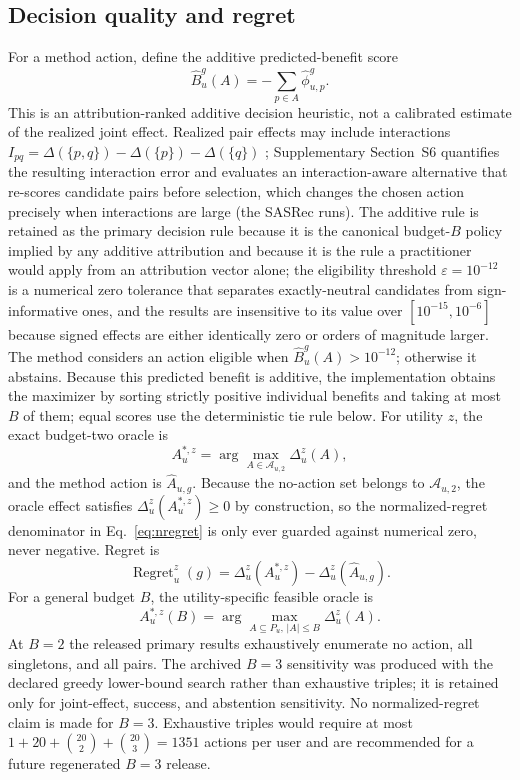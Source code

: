 \documentclass[a4paper,fleqn,doubleblind]{cas-sc}
\begin{document}
\subsection{Decision quality and regret}
For a method action, define the additive predicted-benefit score
\begin{equation}
\widehat B_u^g(A)=-\sum_{p\in A}\widehat\phi_{u,p}^g.
\label{eq:predicted-benefit}
\end{equation}
This is an attribution-ranked additive decision heuristic, not a calibrated estimate of the realized joint effect. Realized pair effects may include interactions $I_{pq}=\Delta(\{p,q\})-\Delta(\{p\})-\Delta(\{q\})$ \cite{sundararajan2020shapleytaylor,janizek2021axiomatic}; Supplementary Section~S6 quantifies the resulting interaction error and evaluates an interaction-aware alternative that re-scores candidate pairs before selection, which changes the chosen action precisely when interactions are large (the SASRec runs). The additive rule is retained as the primary decision rule because it is the canonical budget-$B$ policy implied by any additive attribution and because it is the rule a practitioner would apply from an attribution vector alone; the eligibility threshold $\varepsilon=10^{-12}$ is a numerical zero tolerance that separates exactly-neutral candidates from sign-informative ones, and the results are insensitive to its value over $[10^{-15},10^{-6}]$ because signed effects are either identically zero or orders of magnitude larger. The method considers an action eligible when $\widehat B_u^g(A)>10^{-12}$; otherwise it abstains. Because this predicted benefit is additive, the implementation obtains the maximizer by sorting strictly positive individual benefits and taking at most $B$ of them; equal scores use the deterministic tie rule below. For utility $z$, the exact budget-two oracle is
\begin{equation}
A_u^{*,z}=\arg\max_{A\in\mathcal A_{u,2}}\Delta_u^z(A),
\end{equation}
and the method action is $\widehat A_{u,g}$. Because the no-action set belongs to $\mathcal A_{u,2}$, the oracle effect satisfies $\Delta_u^z(A_u^{*,z})\ge0$ by construction, so the normalized-regret denominator in Eq.~\eqref{eq:nregret} is only ever guarded against numerical zero, never negative. Regret is
\begin{equation}
\operatorname{Regret}_u^z(g)=\Delta_u^z(A_u^{*,z})-\Delta_u^z(\widehat A_{u,g}).
\end{equation}
For a general budget $B$, the utility-specific feasible oracle is
\begin{equation}
A_u^{*,z}(B)=\arg\max_{A\subseteq P_u,\,|A|\le B}\Delta_u^z(A).
\end{equation}
At $B=2$ the released primary results exhaustively enumerate no action, all singletons, and all pairs. The archived $B=3$ sensitivity was produced with the declared greedy lower-bound search rather than exhaustive triples; it is retained only for joint-effect, success, and abstention sensitivity. No normalized-regret claim is made for $B=3$. Exhaustive triples would require at most $1+20+\binom{20}{2}+\binom{20}{3}=1351$ actions per user and are recommended for a future regenerated $B=3$ release.
\end{document}
